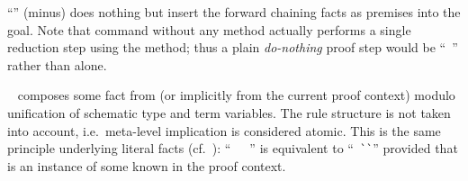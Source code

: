 \begin{isabellebody}
\begin{isamarkuptext}
  \begin{description}
  
  \item ``\hyperlink{method.-}{\mbox{}}'' (minus) does nothing but insert the forward
  chaining facts as premises into the goal.  Note that command
  \hyperlink{command.proof}{\mbox{}} without any method actually performs a single
  reduction step using the \hyperlink{method.Pure.rule}{\mbox{}} method; thus a plain
  \emph{do-nothing} proof step would be ``\hyperlink{command.proof}{\mbox{}}~'' rather than \hyperlink{command.proof}{\mbox{}} alone.
  
  \item \hyperlink{method.fact}{\mbox{}}~ composes some fact from
   (or implicitly from the current proof context)
  modulo unification of schematic type and term variables.  The rule
  structure is not taken into account, i.e.\ meta-level implication is
  considered atomic.  This is the same principle underlying literal
  facts (cf.\ ): ``\hyperlink{command.have}{\mbox{}}~~\hyperlink{command.by}{\mbox{}}~'' is equivalent to ``\hyperlink{command.note}{\mbox{}}~\verb|`|\verb|`|'' provided that
   is an instance of some known  in the
  proof context.
  

\end{description}
\end{isamarkuptext}
\end{isabellebody}
